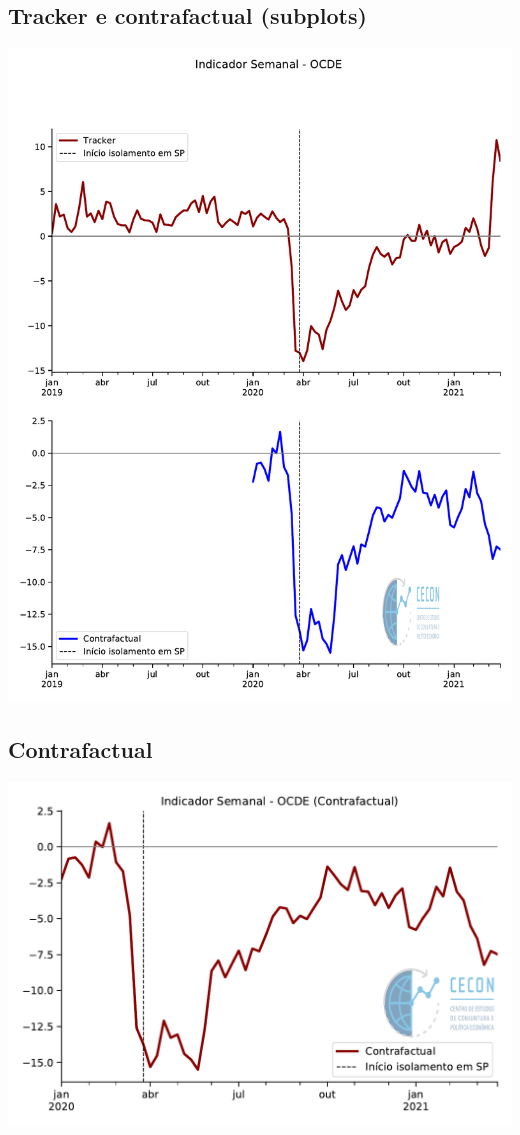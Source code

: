 \documentclass{SelfArx}
\begin{document}
\subsection*{Tracker e contrafactual (subplots)}
\label{sec:orga853061}
\begin{center}
\includegraphics[width=.9\linewidth]{./figs/Granulares/OCDE_Subplots.pdf}
\end{center}

\subsection*{Contrafactual}
\label{sec:orge4d2f71}
\begin{center}
\includegraphics[width=.9\linewidth]{./figs/Granulares/OCDE_Contrafactual.pdf}
\end{center}
\end{document}
